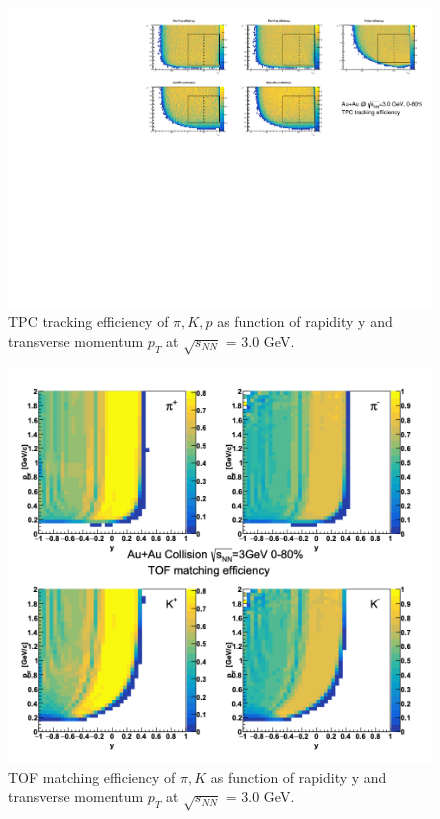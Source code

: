 \begin{figure}[hbt!]
\centering
\includegraphics[width=0.65\linewidth]{figures/chapter02/3gev_TPC_eff.pdf}
\caption{TPC tracking efficiency of $\pi, K, p$ as function of rapidity y and transverse momentum $p_T$ at $\sqrt{s_{NN}}$ = 3.0 GeV.}
\label{fig:3gev_piKp_TPCeff}
\end{figure}

\begin{figure}[hbt!]
\centering
\includegraphics[width=0.55\linewidth]{figures/chapter02/3gev_TOF_eff.png}
\caption{TOF matching efficiency of $\pi, K$ as function of rapidity y and transverse momentum $p_T$ at $\sqrt{s_{NN}}$ = 3.0 GeV.}
\label{fig:3gev_piKp_TOFeff}
\end{figure}


